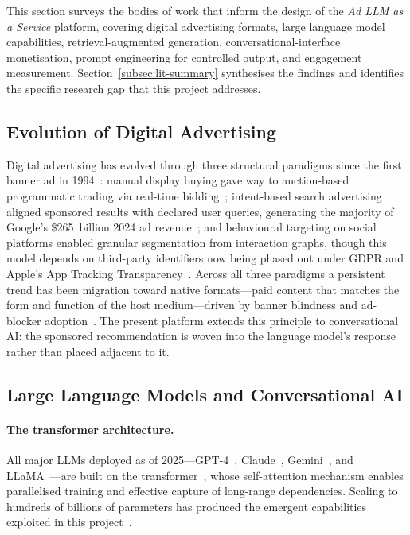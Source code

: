 

This section surveys the bodies of work that inform the design of the
\textit{Ad LLM as a Service} platform, covering digital advertising
formats, large language model capabilities, retrieval-augmented
generation, conversational-interface monetisation, prompt engineering
for controlled output, and engagement measurement.
Section~\ref{subsec:lit-summary} synthesises the findings and
identifies the specific research gap that this project addresses.

\subsection{Evolution of Digital Advertising}
\label{subsec:evolution-ads}

Digital advertising has evolved through three structural paradigms since the first banner ad in 1994~\cite{hotwired1994}: manual display buying gave way to auction-based programmatic trading via real-time bidding~\cite{yuan2013rtb, emarketer2022programmatic}; intent-based search advertising aligned sponsored results with declared user queries, generating the majority of Google's \$265~billion 2024 ad revenue~\cite{statista2024google}; and behavioural targeting on social platforms enabled granular segmentation from interaction graphs, though this model depends on third-party identifiers now being phased out under GDPR and Apple's App Tracking Transparency~\cite{gdpr2016, appleatt2021}. Across all three paradigms a persistent trend has been migration toward native formats---paid content that matches the form and function of the host medium---driven by banner blindness and ad-blocker adoption~\cite{wojdynski2016native}. The present platform extends this principle to conversational AI: the sponsored recommendation is woven into the language model's response rather than placed adjacent to it.

\subsection{Large Language Models and Conversational AI}
\label{subsec:llm-background}

\paragraph{The transformer architecture.}
All major LLMs deployed as of 2025---GPT-4~\cite{brown2020gpt3,openai2023gpt4}, Claude~\cite{anthropic2024claude3}, Gemini~\cite{google2024gemini}, and LLaMA~\cite{touvron2023llama}---are built on the transformer~\cite{vaswani2017attention}, whose self-attention mechanism enables parallelised training and effective capture of long-range dependencies. Scaling to hundreds of billions of parameters has produced the emergent capabilities exploited in this project~\cite{wei2022emergent}.

